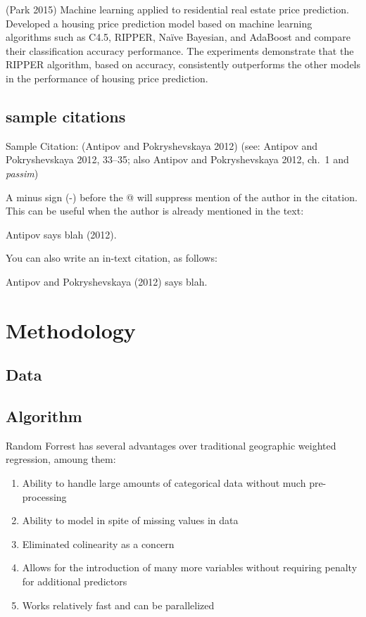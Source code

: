 \documentclass[]{article}
\providecommand{\tightlist}{%
  \setlength{\itemsep}{0pt}\setlength{\parskip}{0pt}}
\begin{document}
(Park 2015) Machine learning applied to residential real estate price
prediction. Developed a housing price prediction model based on machine
learning algorithms such as C4.5, RIPPER, Naïve Bayesian, and AdaBoost
and compare their classification accuracy performance. The experiments
demonstrate that the RIPPER algorithm, based on accuracy, consistently
outperforms the other models in the performance of housing price
prediction.

\subsection{sample citations}\label{sample-citations}

Sample Citation: (Antipov and Pokryshevskaya 2012) (see: Antipov and
Pokryshevskaya 2012, 33--35; also Antipov and Pokryshevskaya 2012, ch.~1
and \emph{passim})

A minus sign (-) before the @ will suppress mention of the author in the
citation. This can be useful when the author is already mentioned in the
text:

Antipov says blah (2012).

You can also write an in-text citation, as follows:

Antipov and Pokryshevskaya (2012) says blah.

\section{Methodology}\label{methodology}

\subsection{Data}\label{data}

\subsection{Algorithm}\label{algorithm}

Random Forrest has several advantages over traditional geographic
weighted regression, amoung them:

\begin{enumerate}
\def\labelenumi{\arabic{enumi}.}
\tightlist
\item
  Ability to handle large amounts of categorical data without much
  pre-processing
\item
  Ability to model in spite of missing values in data
\item
  Eliminated colinearity as a concern
\item
  Allows for the introduction of many more variables without requiring
  penalty for additional predictors
\item
  Works relatively fast and can be parallelized
\end{enumerate}
\end{document}
